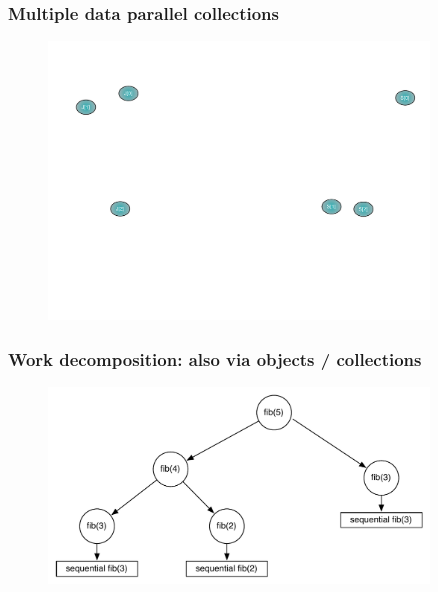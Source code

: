 \begin{frame}
  \frametitle{Multiple data parallel collections}
  \begin{figure}\includegraphics[width=0.9\textwidth]{../figures/progmodel/03-many-data-parallel-arrays.pdf}\end{figure}
\end{frame}


\begin{frame}
    \frametitle{Work decomposition: also via objects / collections}
  \begin{figure}\includegraphics[width=0.9\textwidth]{../figures/tree-threshold.pdf}\end{figure}
\end{frame}


